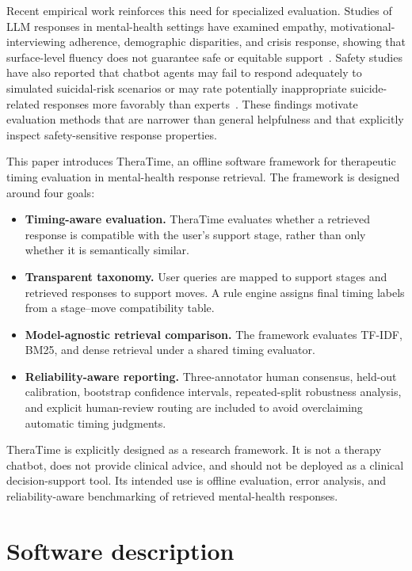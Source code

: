 \documentclass[preprint,12pt,a4paper]{elsarticle}
\begin{document}
Recent empirical work reinforces this need for specialized evaluation. Studies of LLM responses in mental-health settings have examined empathy, motivational-interviewing adherence, demographic disparities, and crisis response, showing that surface-level fluency does not guarantee safe or equitable support~\cite{Sorin2024LLMEmpathy,Gabriel2024CanAIRelate}. Safety studies have also reported that chatbot agents may fail to respond adequately to simulated suicidal-risk scenarios or may rate potentially inappropriate suicide-related responses more favorably than experts~\cite{Pichowicz2025ChatbotSuicide,Heston2025SIRI}. These findings motivate evaluation methods that are narrower than general helpfulness and that explicitly inspect safety-sensitive response properties.

This paper introduces TheraTime, an offline software framework for therapeutic timing evaluation in mental-health response retrieval. The framework is designed around four goals:

\begin{itemize}
    \item \textbf{Timing-aware evaluation.} TheraTime evaluates whether a retrieved response is compatible with the user's support stage, rather than only whether it is semantically similar.
    \item \textbf{Transparent taxonomy.} User queries are mapped to support stages and retrieved responses to support moves. A rule engine assigns final timing labels from a stage--move compatibility table.
    \item \textbf{Model-agnostic retrieval comparison.} The framework evaluates TF-IDF, BM25, and dense retrieval under a shared timing evaluator.
    \item \textbf{Reliability-aware reporting.} Three-annotator human consensus, held-out calibration, bootstrap confidence intervals, repeated-split robustness analysis, and explicit human-review routing are included to avoid overclaiming automatic timing judgments.
\end{itemize}

TheraTime is explicitly designed as a research framework. It is not a therapy chatbot, does not provide clinical advice, and should not be deployed as a clinical decision-support tool. Its intended use is offline evaluation, error analysis, and reliability-aware benchmarking of retrieved mental-health responses.

\section{Software description}
\label{sec:software_description}
\end{document}
